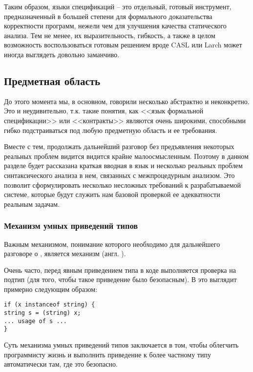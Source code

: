Таким образом, языки спецификаций -- это отдельный, готовый инструмент, предназначенный в большей степени для формального доказательства корректности программ, нежели чем для улучшения качества статического анализа. Тем не менее, их выразительность, гибкость, а также в целом возможность воспользоваться готовым решением вроде CASL или Larch может иногда выглядеть довольно заманчиво. 



\newpage



\subsection{Предметная область}

До этого момента мы, в основном, говорили несколько абстрактно и неконкретно. Это и неудивительно, т.к. такие понятия, как <<язык формальной спецификации>> или <<контракты>> являются очень широкими, способными гибко подстраиваться под любую предметную область и ее требования.

Вместе с тем, продолжать дальнейший разговор без предъявления некоторых реальных проблем видится видится крайне малоосмысленным. Поэтому в данном разделе будет рассказана краткая вводная в язык  и несколько реальных проблем синтаксического анализа в нем, связанных с межпроцедурным анализом. Это позволит сформулировать несколько несложных требований к разрабатываемой системе, которые будут служить нам базовой проверкой ее адекватности реальным задачам.


\subsubsection{Механизм умных приведений типов}

Важным механизмом, понимание которого необходимо для дальнейшего разговоре о , является механизм  (англ. ). 

Очень часто, перед явным приведением типа в коде выполняется проверка на подтип (для того, чтобы такое приведение было безопасным). В  это выглядит примерно следующим образом:

\begin{verbatim}
if (x instanceof string) {
string s = (string) x;
... usage of s ...
}
\end{verbatim}

Суть механизма умных приведений типов заключается в том, чтобы облегчить программисту жизнь и выполнить приведение к более частному типу автоматически там, где это безопасно. 

